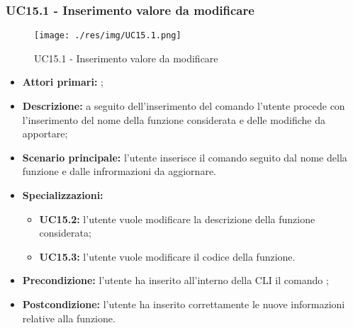 \subsubsection{UC15.1 - Inserimento valore da modificare}
\begin{figure}[H]
	\centering
	\texttt{[image: ./res/img/UC15.1.png]}
	\caption {UC15.1 - Inserimento valore da modificare}
\end{figure}
\begin{itemize}
	\item \textbf{Attori primari:} \us{};
	\item \textbf{Descrizione:} a seguito dell'inserimento del comando \edit{} l’utente procede con l’inserimento del nome della funzione considerata e delle modifiche da apportare; 
	\item \textbf{Scenario principale:} l'utente inserisce il comando \edit{} seguito dal nome della funzione e dalle infrormazioni da aggiornare. 
	\item \textbf{Specializzazioni:} 
	\begin{itemize}
		\item \textbf{UC15.2:} l’utente vuole modificare la descrizione della funzione considerata; 
		\item \textbf{UC15.3:} l’utente vuole modificare il codice della funzione. 
	\end{itemize}
	\item \textbf{Precondizione:} l’utente ha inserito all’interno della CLI il comando \edit{}; 
	\item \textbf{Postcondizione:} l’utente ha inserito correttamente le nuove informazioni relative alla funzione.
\end{itemize}